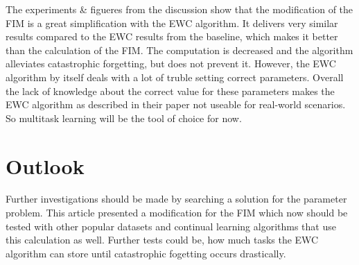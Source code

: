 The experiments \& figueres from the discussion show that the modification of the FIM is a great simplification with the EWC algorithm.
It delivers very similar results compared to the EWC results from the baseline, which makes it better than the calculation of the FIM.
The computation is decreased and the algorithm alleviates catastrophic forgetting, but does not prevent it.
However, the EWC algorithm by itself deals with a lot of truble setting correct parameters.
Overall the lack of knowledge about the correct value for these parameters makes the EWC algorithm as described in their paper not useable for real-world scenarios.
So multitask learning will be the tool of choice for now.

\section{Outlook}

Further investigations should be made by searching a solution for the parameter problem.
This article presented a modification for the FIM which now should be tested with other popular datasets and continual learning algorithms that use this calculation as well.
Further tests could be, how much tasks the EWC algorithm can store until catastrophic fogetting occurs drastically.
